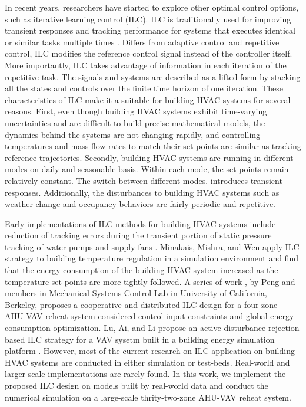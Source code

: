 \documentclass[conference]{IEEEtran}
\begin{document}
In recent years, researchers have started to explore other optimal control options, such as iterative learning control (ILC). ILC is traditionally used for improving transient responses and tracking performance for systems that executes identical or similar tasks multiple times \cite{bristow2006survey,ahn2x007iterative}. Differs from adaptive control and repetitive control, ILC modifies the reference control signal instead of the controller itself. More importantly, ILC takes advantage of information in each iteration of the repetitive task. The signals and systems are described as a lifted form by stacking all the states and controls over the finite time horizon of one iteration. These characteristics of ILC make it a suitable for building HVAC systems for several reasons. First, even though building HVAC systems exhibit time-varying uncertainties and are difficult to build precise mathematical models, the dynamics behind the systems are not changing rapidly, and controlling temperatures and mass flow rates to match their set-points are similar as tracking reference trajectories. Secondly, building HVAC systems are running in different modes on daily and seasonable basis. Within each mode, the set-points remain relatively constant. The switch between different modes. introduces transient responses. Additionally, the disturbances to building HVAC systems such as weather change and occupancy behaviors are fairly periodic and repetitive. 

Early implementations of ILC methods for building HVAC systems include reduction of tracking errors during the transient portion of static pressure tracking of water pumps and supply fans \cite{yan2010iterative}. Minakais, Mishra, and Wen apply ILC strategy to building temperature regulation in a simulation environment \cite{minakais2014groundhog} and find that the energy consumption of the building HVAC system increased as the temperature set-points are more tightly followed. A series of work \cite{peng2016iterative,peng2016optimization,peng2017constrained,peng2017distributed,peng2018concurrent,peng2019optimization}, by Peng and members in Mechanical Systems Control Lab in University of California, Berkeley, proposes a cooperative and distributed ILC design for a four-zone AHU-VAV reheat system considered control input constraints and global energy consumption optimization. Lu, Ai, and Li propose an active disturbance rejection based ILC strategy for a VAV sysetm built in a building energy simulation platform \cite{lu2018active}. However, most of the current research on ILC application on building HVAC systems are conducted in either simulation or test-beds. Real-world and larger-scale implementations are rarely found. In this work, we implement the proposed ILC design on models built by real-world data and conduct the numerical simulation on a large-scale thrity-two-zone AHU-VAV reheat system.
\end{document}
